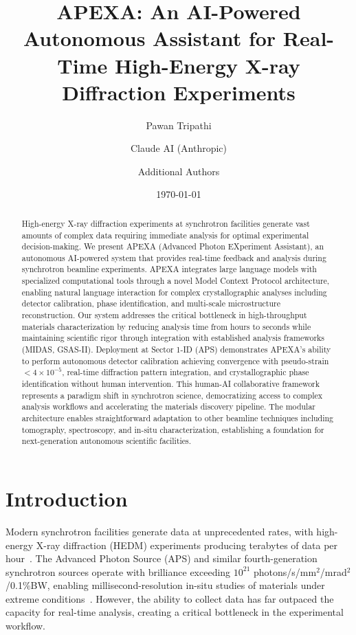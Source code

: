 \documentclass[11pt]{article}
\title{\textbf{APEXA: An AI-Powered Autonomous Assistant for Real-Time High-Energy X-ray Diffraction Experiments}}
\author[1,2]{Pawan Tripathi}
\author[1,2]{Claude AI (Anthropic)}
\author[1,2,*]{Additional Authors}
\affil[1]{Advanced Photon Source, Argonne National Laboratory, Lemont, IL 60439, USA}
\affil[2]{Materials Science Division, Argonne National Laboratory, Lemont, IL 60439, USA}
\affil[*]{Corresponding author: ptripathi@anl.gov}
\date{\today}
\begin{document}
\maketitle

\begin{abstract}
High-energy X-ray diffraction experiments at synchrotron facilities generate vast amounts of complex data requiring immediate analysis for optimal experimental decision-making. We present APEXA (Advanced Photon EXperiment Assistant), an autonomous AI-powered system that provides real-time feedback and analysis during synchrotron beamline experiments. APEXA integrates large language models with specialized computational tools through a novel Model Context Protocol architecture, enabling natural language interaction for complex crystallographic analyses including detector calibration, phase identification, and multi-scale microstructure reconstruction. Our system addresses the critical bottleneck in high-throughput materials characterization by reducing analysis time from hours to seconds while maintaining scientific rigor through integration with established analysis frameworks (MIDAS, GSAS-II). Deployment at Sector 1-ID (APS) demonstrates APEXA's ability to perform autonomous detector calibration achieving convergence with pseudo-strain $< 4 \times 10^{-5}$, real-time diffraction pattern integration, and crystallographic phase identification without human intervention. This human-AI collaborative framework represents a paradigm shift in synchrotron science, democratizing access to complex analysis workflows and accelerating the materials discovery pipeline. The modular architecture enables straightforward adaptation to other beamline techniques including tomography, spectroscopy, and in-situ characterization, establishing a foundation for next-generation autonomous scientific facilities.
\end{abstract}

\section{Introduction}

Modern synchrotron facilities generate data at unprecedented rates, with high-energy X-ray diffraction (HEDM) experiments producing terabytes of data per hour~\cite{sharma2012new, suter2006forward}. The Advanced Photon Source (APS) and similar fourth-generation synchrotron sources operate with brilliance exceeding $10^{21}$ photons/s/mm$^2$/mrad$^2$/0.1\%BW, enabling millisecond-resolution in-situ studies of materials under extreme conditions~\cite{hruszkewycz2017high}. However, the ability to collect data has far outpaced the capacity for real-time analysis, creating a critical bottleneck in the experimental workflow.
\end{document}
